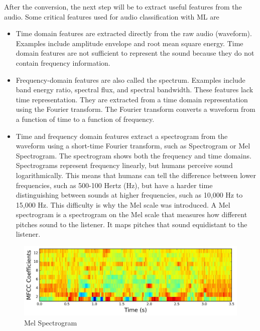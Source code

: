 \documentclass[11pt]{article}
\begin{document}
After the conversion, the next step will be to extract useful features from the audio. Some critical features used for audio classification with ML are

\begin{itemize}

  \item Time domain features are extracted directly from the raw audio (waveform). Examples include amplitude envelope and root mean square energy. Time domain features are not sufficient to represent the sound because they do not contain frequency information.

  \item Frequency-domain features are also called the spectrum. Examples include band energy ratio, spectral flux, and spectral bandwidth. These features lack time representation. They are extracted from a time domain representation using the Fourier transform. The Fourier transform converts a waveform from a function of time to a function of frequency.

  \item Time and frequency domain features extract a spectrogram from the waveform using a short-time Fourier transform, such as Spectrogram or Mel Spectrogram. The spectrogram shows both the frequency and time domains. Spectrograms represent frequency linearly, but humans perceive sound logarithmically. This means that humans can tell the difference between lower frequencies, such as 500-100 Hertz (Hz), but have a harder time distinguishing between sounds at higher frequencies, such as 10,000 Hz to 15,000 Hz. This difficulty is why the Mel scale was introduced. A Mel spectrogram is a spectrogram on the Mel scale that measures how different pitches sound to the listener. It maps pitches that sound equidistant to the listener.
\end{itemize}


\begin{figure}[h]
  \centering
  \begin{minipage}{1\textwidth}
    \centering
    \includegraphics[width=1\textwidth]{image/spectro.jpg}
    \caption{Mel Spectrogram}
  \end{minipage}\hfill
\end{figure}
\end{document}
